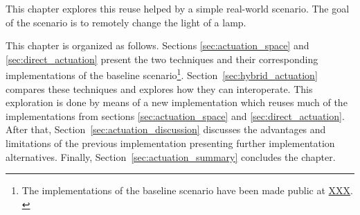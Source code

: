 This chapter explores this reuse helped by a simple real-world scenario.
The goal of the scenario is to remotely change the light of a lamp.

\bigskip

This chapter is organized as follows.
Sections \ref{sec:actuation_space} and \ref{sec:direct_actuation} present the two techniques and their corresponding implementations of the baseline scenario\footnote{
The implementations of the baseline scenario have been made public at \url{XXX}. %
\label{fn:impl_available}
}.
Section~\ref{sec:hybrid_actuation} compares these techniques and explores how they can interoperate. %
This exploration is done by means of a new implementation which reuses much of the implementations from sections \ref{sec:actuation_space} and \ref{sec:direct_actuation}.
After that, Section~\ref{sec:actuation_discussion} discusses the advantages and limitations of the previous implementation presenting further implementation alternatives.
Finally, Section~\ref{sec:actuation_summary} concludes the chapter.








